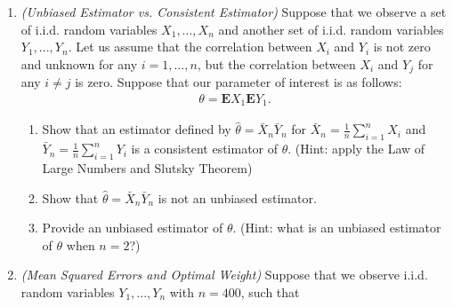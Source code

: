 \documentclass[11pt]{article}
\begin{document}
\begin{enumerate}
	\item \textit{(Unbiased Estimator vs. Consistent Estimator)} Suppose that we observe a set of i.i.d. random variables $X_1,...,X_n$ and another set of i.i.d. random variables $Y_1,...,Y_n$. Let us assume that the correlation between $X_i$ and $Y_i$ is not zero and unknown for any $i=1,...,n$, but the correlation between $X_i$ and $Y_j$ for any $i \ne j$ is zero. Suppose that our parameter of interest is as follows:
	\begin{eqnarray*}
		\theta = \mathbf{E}X_1 \mathbf{E}Y_1.
	\end{eqnarray*}
	\begin{enumerate}
	\item Show that an estimator defined by $\hat\theta=\bar X_n \bar Y_n$ for $\bar X_n = \frac{1}{n}\sum_{i=1}^n X_i$ and  $\bar Y_n = \frac{1}{n}\sum_{i=1}^n Y_i$ is a consistent estimator of $\theta$.
	(Hint: apply the Law of Large Numbers and Slutsky Theorem)
	\item Show that $\hat\theta=\bar X_n \bar Y_n$ is not an unbiased estimator.
	\item  Provide an unbiased estimator of $\theta$. (Hint: what is an unbiased estimator of $\theta$ when $n=2$?)
	\end{enumerate}
    \item  \textit{(Mean Squared Errors and Optimal Weight)} Suppose that we observe i.i.d. random variables $Y_1,...,Y_n$ with $n = 400$, such that

\end{enumerate}
\end{document}
